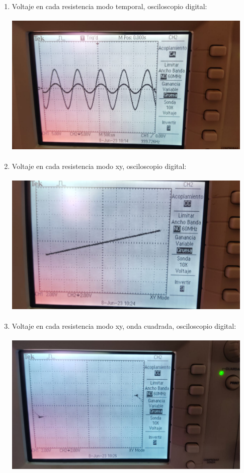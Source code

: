 \documentclass[12pt]{article}
\begin{document}
	\begin{enumerate}
		
		\item Voltaje en cada resistencia modo temporal, osciloscopio digital:
		
		\includegraphics[width=12cm,height=7cm]{Img/lab_5_img_1}
		
		\item Voltaje en cada resistencia modo xy, osciloscopio digital:
		
		\includegraphics[width=12cm,height=7cm]{Img/lab_5_img_2}
		
		\item Voltaje en cada resistencia modo xy, onda cuadrada, osciloscopio digital:
		
		\includegraphics[width=12cm,height=7cm]{Img/lab_5_img_3}
		

\end{enumerate}
\end{document}
